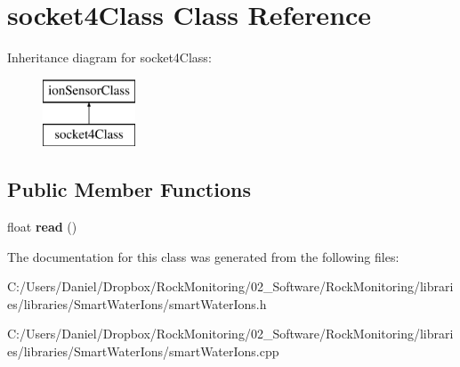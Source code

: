 \hypertarget{classsocket4_class}{}\section{socket4\+Class Class Reference}
\label{classsocket4_class}
Inheritance diagram for socket4\+Class\+:\begin{figure}[H]
\begin{center}
\leavevmode
\includegraphics[height=2.000000cm]{classsocket4_class}
\end{center}
\end{figure}
\subsection*{Public Member Functions}
\begin{DoxyCompactItemize}
\item 
float {\bfseries read} ()\hypertarget{classsocket4_class_afd0f2e46f0001a07762c3ecd9827ec27}{}\label{classsocket4_class_afd0f2e46f0001a07762c3ecd9827ec27}

\end{DoxyCompactItemize}


The documentation for this class was generated from the following files\+:\begin{DoxyCompactItemize}
\item 
C\+:/\+Users/\+Daniel/\+Dropbox/\+Rock\+Monitoring/02\+\_\+\+Software/\+Rock\+Monitoring/libraries/libraries/\+Smart\+Water\+Ions/smart\+Water\+Ions.\+h\item 
C\+:/\+Users/\+Daniel/\+Dropbox/\+Rock\+Monitoring/02\+\_\+\+Software/\+Rock\+Monitoring/libraries/libraries/\+Smart\+Water\+Ions/smart\+Water\+Ions.\+cpp\end{DoxyCompactItemize}
